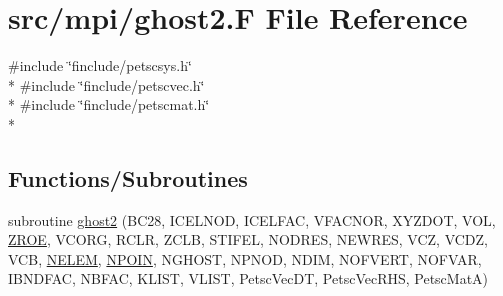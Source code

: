 \hypertarget{mpi_2ghost2_8_f}{\section{src/mpi/ghost2.F File Reference}
\label{mpi_2ghost2_8_f}
}
{\ttfamily \#include \char`\"{}finclude/petscsys.\-h\char`\"{}}\\*
{\ttfamily \#include \char`\"{}finclude/petscvec.\-h\char`\"{}}\\*
{\ttfamily \#include \char`\"{}finclude/petscmat.\-h\char`\"{}}\\*
\subsection*{Functions/\-Subroutines}
\begin{DoxyCompactItemize}
\item 
subroutine \hyperlink{mpi_2ghost2_8_f_ada232e5267a40e4a7bb3766949b709a7}{ghost2} (B\-C28, I\-C\-E\-L\-N\-O\-D, I\-C\-E\-L\-F\-A\-C, V\-F\-A\-C\-N\-O\-R, X\-Y\-Z\-D\-O\-T, V\-O\-L, \hyperlink{myts_8com_a0c4fbcdb78e6b50c8919d714e4b5a694}{Z\-R\-O\-E}, V\-C\-O\-R\-G, R\-C\-L\-R, Z\-C\-L\-B, S\-T\-I\-F\-E\-L, N\-O\-D\-R\-E\-S, N\-E\-W\-R\-E\-S, V\-C\-Z, V\-C\-D\-Z, V\-C\-B, \hyperlink{mesh_8com_aee5e75b79d0e815c0603cfbccc618957}{N\-E\-L\-E\-M}, \hyperlink{mesh_8com_ae28c1572321efcd8715b974d87d20c58}{N\-P\-O\-I\-N}, N\-G\-H\-O\-S\-T, N\-P\-N\-O\-D, N\-D\-I\-M, N\-O\-F\-V\-E\-R\-T, N\-O\-F\-V\-A\-R, I\-B\-N\-D\-F\-A\-C, N\-B\-F\-A\-C, K\-L\-I\-S\-T, V\-L\-I\-S\-T, Petsc\-Vec\-D\-T, Petsc\-Vec\-R\-H\-S, Petsc\-Mat\-A)
\end{DoxyCompactItemize}


